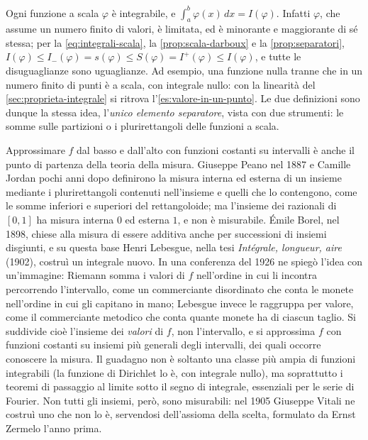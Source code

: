 \begin{osservazione}\label{oss:integrale-scala}
Ogni funzione a scala $\varphi$ è integrabile, e $\int_{a}^{b}\varphi(x)\,dx=I(\varphi)$.
Infatti $\varphi$, che assume un numero finito di valori, è limitata, ed è minorante e
maggiorante di sé stessa; per la \eqref{eq:integrali-scala}, la
\cref{prop:scala-darboux} e la \cref{prop:separatori},
$I(\varphi)\le I_{-}(\varphi)=s(\varphi)\le S(\varphi)=I^{+}(\varphi)\le I(\varphi)$, e
tutte le disuguaglianze sono uguaglianze. Ad esempio, una funzione nulla tranne che in
un numero finito di punti è a scala, con integrale nullo: con la linearità del
\cref{sec:proprieta-integrale} si ritrova l'\cref{es:valore-in-un-punto}. Le due
definizioni sono dunque la stessa idea, l'\emph{unico elemento separatore}, vista con
due strumenti: le somme sulle partizioni o i plurirettangoli delle funzioni a scala.
\end{osservazione}

\begin{notastorica}
Approssimare $f$ dal basso e dall'alto con funzioni costanti su intervalli è anche il
punto di partenza della teoria della misura. Giuseppe Peano nel 1887 e Camille Jordan
pochi anni dopo definirono la misura interna ed esterna di un insieme mediante i
plurirettangoli contenuti nell'insieme e quelli che lo contengono, come le somme
inferiori e superiori del rettangoloide; ma l'insieme dei razionali di $[0,1]$ ha misura
interna $0$ ed esterna $1$, e non è misurabile. Émile Borel, nel 1898, chiese alla misura
di essere additiva anche per successioni di insiemi disgiunti, e su questa base Henri
Lebesgue, nella tesi \emph{Intégrale, longueur, aire} (1902), costruì un integrale nuovo.
In una conferenza del 1926 ne spiegò l'idea con un'immagine: Riemann somma i valori di
$f$ nell'ordine in cui li incontra percorrendo l'intervallo, come un commerciante
disordinato che conta le monete nell'ordine in cui gli capitano in mano; Lebesgue
invece le raggruppa per valore, come il commerciante metodico che conta quante monete
ha di ciascun taglio. Si suddivide cioè l'insieme dei \emph{valori} di $f$, non
l'intervallo, e si approssima $f$ con funzioni costanti su insiemi più generali degli
intervalli, dei quali occorre conoscere la misura. Il guadagno non è soltanto una classe
più ampia di funzioni integrabili (la funzione di Dirichlet lo è, con integrale nullo),
ma soprattutto i teoremi di passaggio al limite sotto il segno di integrale, essenziali
per le serie di Fourier. Non tutti gli insiemi, però, sono misurabili: nel 1905
Giuseppe Vitali ne costruì uno che non lo è, servendosi dell'assioma della scelta,
formulato da Ernst Zermelo l'anno prima.
\end{notastorica}
